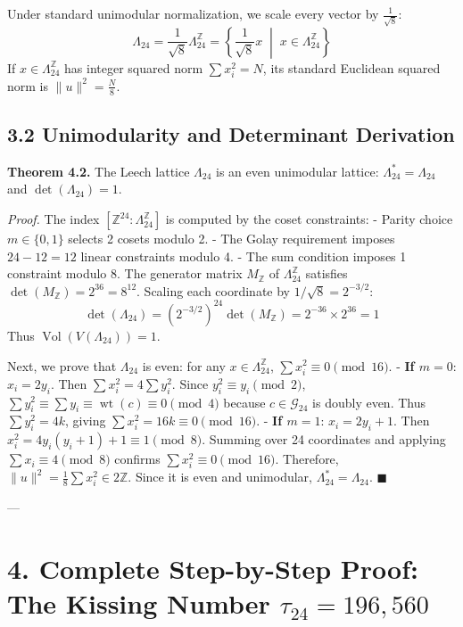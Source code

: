 \documentclass[11pt,twoside,openright]{amsbook}
\begin{document}
Under standard unimodular normalization, we scale every vector by $\frac{1}{\sqrt{8}}$:
$$\Lambda_{24} = \frac{1}{\sqrt{8}} \Lambda_{24}^{\mathbb{Z}} = \left\{ \frac{1}{\sqrt{8}} x \;\middle|\; x \in \Lambda_{24}^{\mathbb{Z}} \right\}$$
If $x \in \Lambda_{24}^{\mathbb{Z}}$ has integer squared norm $\sum x_i^2 = N$, its standard Euclidean squared norm is $\|u\|^2 = \frac{N}{8}$.

\subsection{3.2 Unimodularity and Determinant Derivation}

\textbf{Theorem 4.2.} The Leech lattice $\Lambda_{24}$ is an even unimodular lattice: $\Lambda_{24}^* = \Lambda_{24}$ and $\det(\Lambda_{24}) = 1$.

\textit{Proof.} The index $[\mathbb{Z}^{24} : \Lambda_{24}^{\mathbb{Z}}]$ is computed by the coset constraints:
- Parity choice $m \in \{0, 1\}$ selects 2 cosets modulo 2.
- The Golay requirement imposes $24 - 12 = 12$ linear constraints modulo 4.
- The sum condition imposes 1 constraint modulo 8.
The generator matrix $M_{\mathbb{Z}}$ of $\Lambda_{24}^{\mathbb{Z}}$ satisfies $\det(M_{\mathbb{Z}}) = 2^{36} = 8^{12}$.
Scaling each coordinate by $1/\sqrt{8} = 2^{-3/2}$:
$$\det(\Lambda_{24}) = (2^{-3/2})^{24} \det(M_{\mathbb{Z}}) = 2^{-36} \times 2^{36} = 1$$
Thus $\operatorname{Vol}(V(\Lambda_{24})) = 1$.

Next, we prove that $\Lambda_{24}$ is even: for any $x \in \Lambda_{24}^{\mathbb{Z}}$, $\sum x_i^2 \equiv 0 \pmod{16}$.
- \textbf{If $m = 0$}: $x_i = 2y_i$. Then $\sum x_i^2 = 4 \sum y_i^2$. Since $y_i^2 \equiv y_i \pmod 2$, $\sum y_i^2 \equiv \sum y_i \equiv \operatorname{wt}(c) \equiv 0 \pmod 4$ because $c \in \mathcal{G}_{24}$ is doubly even. Thus $\sum y_i^2 = 4k$, giving $\sum x_i^2 = 16k \equiv 0 \pmod{16}$.
- \textbf{If $m = 1$}: $x_i = 2y_i + 1$. Then $x_i^2 = 4y_i(y_i + 1) + 1 \equiv 1 \pmod 8$. Summing over 24 coordinates and applying $\sum x_i \equiv 4 \pmod 8$ confirms $\sum x_i^2 \equiv 0 \pmod{16}$.
Therefore, $\|u\|^2 = \frac{1}{8} \sum x_i^2 \in 2\mathbb{Z}$. Since it is even and unimodular, $\Lambda_{24}^* = \Lambda_{24}$. $\blacksquare$

---

\section{4. Complete Step-by-Step Proof: The Kissing Number $\tau_{24} = 196,560$}
\end{document}
